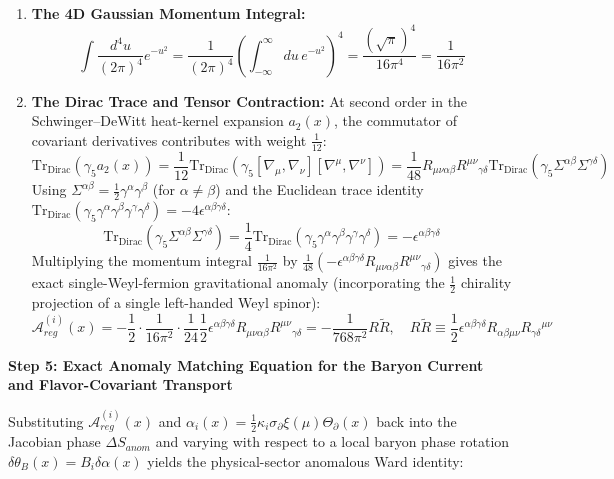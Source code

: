 \documentclass[aps,prd,onecolumn,superscriptaddress,nofootinbib,longbibliography,10pt]{revtex4-2}
\begin{document}
  
\begin{enumerate}
    
\item \textbf{The 4D Gaussian Momentum Integral:}
    \[ \int\frac{d^4u}{(2\pi)^4}e^{-u^2} = \frac{1}{(2\pi)^4}\left(\int_{-\infty}^\infty du\,e^{-u^2}\right)^4 = \frac{(\sqrt{\pi})^4}{16\pi^4} = \frac{1}{16\pi^2} \]
    
\item \textbf{The Dirac Trace and Tensor Contraction:} At second order in the Schwinger–DeWitt heat-kernel expansion \(a_2(x)\), the commutator of covariant derivatives contributes with weight \(\frac{1}{12}\):
    \[ \text{Tr}_{\text{Dirac}}(\gamma_5 a_2(x)) = \frac{1}{12}\text{Tr}_{\text{Dirac}}\left(\gamma_5[\nabla_\mu,\nabla_\nu][\nabla^\mu,\nabla^\nu]\right) = \frac{1}{48}R_{\mu\nu\alpha\beta}R^{\mu\nu}{}_{\gamma\delta}\text{Tr}_{\text{Dirac}}\left(\gamma_5\Sigma^{\alpha\beta}\Sigma^{\gamma\delta}\right) \]
    Using \(\Sigma^{\alpha\beta} = \frac{1}{2}\gamma^\alpha\gamma^\beta\) (for \(\alpha \neq \beta\)) and the Euclidean trace identity \(\text{Tr}_{\text{Dirac}}(\gamma_5\gamma^\alpha\gamma^\beta\gamma^\gamma\gamma^\delta) = -4\epsilon^{\alpha\beta\gamma\delta}\):
    \[ \text{Tr}_{\text{Dirac}}\left(\gamma_5\Sigma^{\alpha\beta}\Sigma^{\gamma\delta}\right) = \frac{1}{4}\text{Tr}_{\text{Dirac}}\left(\gamma_5\gamma^\alpha\gamma^\beta\gamma^\gamma\gamma^\delta\right) = -\epsilon^{\alpha\beta\gamma\delta} \]
    Multiplying the momentum integral \(\frac{1}{16\pi^2}\) by \(\frac{1}{48}(-\epsilon^{\alpha\beta\gamma\delta}R_{\mu\nu\alpha\beta}R^{\mu\nu}{}_{\gamma\delta})\) gives the exact single-Weyl-fermion gravitational anomaly (incorporating the \(\frac{1}{2}\) chirality projection of a single left-handed Weyl spinor):
    \[ \mathcal{A}_{reg}^{(i)}(x) = -\frac{1}{2}\cdot\frac{1}{16\pi^2}\cdot\frac{1}{24}\frac{1}{2}\epsilon^{\alpha\beta\gamma\delta}R_{\mu\nu\alpha\beta}R^{\mu\nu}{}_{\gamma\delta} = -\frac{1}{768\pi^2}R\tilde{R}, \quad R\tilde{R} \equiv \frac{1}{2}\epsilon^{\alpha\beta\gamma\delta}R_{\alpha\beta\mu\nu}R_{\gamma\delta}{}^{\mu\nu} \]
  
\end{enumerate}


  \textbf{Step 5: Exact Anomaly Matching Equation for the Baryon Current and Flavor-Covariant Transport}


  Substituting \(\mathcal{A}_{reg}^{(i)}(x)\) and \(\alpha_i(x) = \frac{1}{2}\kappa_i\sigma_\partial\xi(\mu)\Theta_\partial(x)\) back into the Jacobian phase \(\Delta S_{anom}\) and varying with respect to a local baryon phase rotation \(\delta\theta_B(x) = B_i\delta\alpha(x)\) yields the physical-sector anomalous Ward identity:
\end{document}
